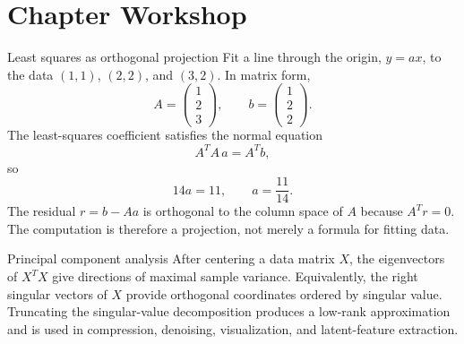 \section{Chapter Workshop}

\begin{workedexample}{Least squares as orthogonal projection}
Fit a line through the origin, $y=ax$, to the data $(1,1)$, $(2,2)$, and $(3,2)$. In matrix form,
\[
    A=\begin{pmatrix}1\\2\\3\end{pmatrix},
    \qquad
    b=\begin{pmatrix}1\\2\\2\end{pmatrix}.
\]
The least-squares coefficient satisfies the normal equation
\[
    A^{T}A\,a=A^{T}b,
\]
so
\[
    14a=11,
    \qquad a=\frac{11}{14}.
\]
The residual $r=b-Aa$ is orthogonal to the column space of $A$ because $A^Tr=0$. The computation is therefore a projection, not merely a formula for fitting data.
\end{workedexample}

\begin{applicationbox}{Principal component analysis}
After centering a data matrix $X$, the eigenvectors of $X^TX$ give directions of maximal sample variance. Equivalently, the right singular vectors of $X$ provide orthogonal coordinates ordered by singular value. Truncating the singular-value decomposition produces a low-rank approximation and is used in compression, denoising, visualization, and latent-feature extraction.
\end{applicationbox}

